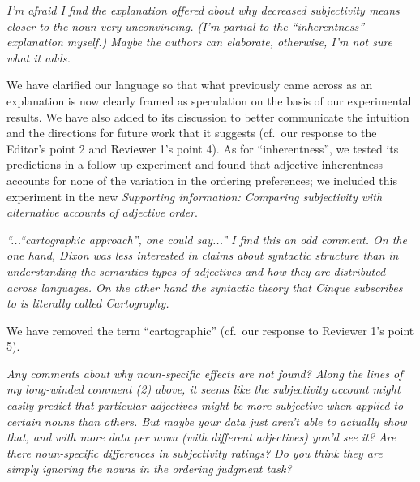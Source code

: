 \documentclass[12pt]{article}
\begin{document}
\item \emph{I'm afraid I find the explanation offered about why decreased subjectivity means closer to the noun very unconvincing. (I'm partial to the ``inherentness'' explanation myself.) Maybe the authors can elaborate, otherwise, I'm not sure what it adds.}

We have clarified our language so that what previously came across as an explanation is now clearly framed as speculation on the basis of our experimental results. We have also added to its discussion to better communicate the intuition and the directions for future work that it suggests (cf.~our response to the Editor's point 2 and Reviewer 1's point 4). As for ``inherentness'', we tested its predictions in a follow-up experiment and found that adjective inherentness accounts for none of the variation in the ordering preferences; we included this experiment in the new \emph{Supporting information: Comparing subjectivity with alternative accounts of adjective order}.

\item \emph{``...``cartographic approach'', one could say...'' I find this an odd comment. On the one hand, Dixon was less interested in claims about syntactic structure than in understanding the semantics types of adjectives and how they are distributed across languages. On the other hand the syntactic theory that Cinque subscribes to is literally called Cartography.}

We have removed the term ``cartographic'' (cf.~our response to Reviewer 1's point 5).

\item \emph{Any comments about why noun-specific effects are not found? Along the lines of my long-winded comment (2) above, it seems like the subjectivity account might easily predict that particular adjectives might be more subjective when applied to certain nouns than others. But maybe your data just aren't able to actually show that, and with more data per noun (with different adjectives) you'd see it? Are there noun-specific differences in subjectivity ratings? Do you think they are simply ignoring the nouns in the ordering judgment task?}
\end{document}
